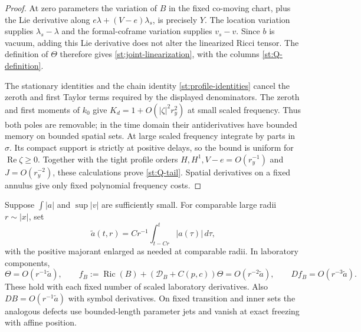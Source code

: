 \begin{proof}
At zero parameters the variation of $B$ in the fixed co-moving
chart, plus the Lie derivative along
$e\lambda+(V-e)\lambda_s$, is precisely $Y$.
The location variation supplies $\lambda_s-\lambda$ and the
formal-coframe variation supplies $v_s-v$.
Since $b$ is vacuum, adding this Lie derivative does not alter
the linearized Ricci tensor.  The definition of $\Theta$
therefore gives \eqref{st:joint-linearization}, with the columns
\eqref{st:Q-definition}.

The stationary identities and the chain identity
\eqref{st:profile-identities} cancel the zeroth and first
Taylor terms required by the displayed denominators.
The zeroth and first moments of $k_0$ give
$K_d=1+O(|\zeta|^2r_y^2)$ at small scaled frequency.
Thus both poles are removable; in the time domain their
antiderivatives have bounded memory on bounded spatial sets.
At large scaled frequency integrate by parts in $\sigma$.
Its compact support is strictly at positive delays, so the
bound is uniform for $\operatorname{Re}\zeta\geq0$.
Together with the tight profile orders
$H,H^1,V-e=O(r_y^{-1})$ and $J=O(r_y^{-2})$, these
calculations prove \eqref{st:Q-tail}.  Spatial derivatives
on a fixed annulus give only fixed polynomial frequency costs.
\end{proof}

\begin{lemma}\label{st:target-defect}
Suppose $\int|a|$ and $\sup|v|$ are sufficiently small.
For comparable large radii $r\sim|x|$, set
\[
 \widetilde a(t,r)
       =Cr^{-1}\int_{t-Cr}^{t}|a(\tau)|\,d\tau,
\]
with the positive majorant enlarged as needed at comparable
radii.  In laboratory components,
\begin{equation}\label{st:target-defect-orders}
 \Theta=O(r^{-1}\widetilde a),\qquad
 f_B:=\operatorname{Ric}(B)
          +(\mathcal D_B+C(p,c))\Theta
                =O(r^{-2}\widetilde a),\qquad
 Df_B=O(r^{-3}\widetilde a).
\end{equation}
These hold with each fixed number of scaled laboratory
derivatives.  Also $DB=O(r^{-1}\widetilde a)$ with symbol
derivatives.  On fixed transition and inner sets the analogous
defects use bounded-length parameter jets and vanish at
exact freezing with affine position.
\end{lemma}


